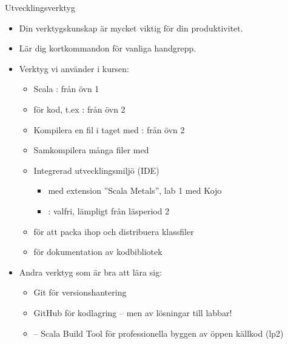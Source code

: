 \begin{Slide}{Utvecklingsverktyg}
\begin{itemize}\SlideFontSmall
\item Din verktygskunskap är mycket viktig för din produktivitet.
\item Lär dig kortkommandon för vanliga handgrepp.
\item Verktyg vi använder i kursen:
\begin{itemize}\SlideFontTiny
\item Scala : från övn 1
\item {} för kod, t.ex : från övn 2
\item Kompilera en fil i taget med : från övn 2
\item Samkompilera många filer med 
\item Integrerad utvecklingsmiljö (IDE)
\begin{itemize}\SlideFontTiny
\item {} med extension ''Scala Metals'', lab 1 med Kojo
\item {}: valfri, lämpligt från läsperiod 2
\end{itemize}\SlideFontTiny
\item {} för att packa ihop och distribuera klassfiler
\item {} för dokumentation av kodbibliotek
\end{itemize}
\item Andra verktyg som är bra att lära sig:
\begin{itemize}\SlideFontTiny
\item Git för versionshantering
\item GitHub för kodlagring -- men  av lösningar till labbar!
\item {} -- Scala Build Tool för professionella byggen av öppen källkod (lp2)
\end{itemize}
\end{itemize}
\end{Slide}







